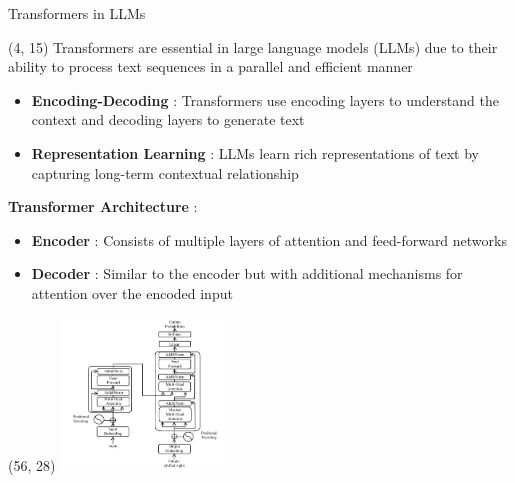 \begin{frame}{Transformers in LLMs}
  \begin{textblock}{55}(4, 15)
    Transformers are essential in large language models (LLMs) due to their ability to process text sequences in a parallel and efficient manner

    \begin{itemize}
        \item \textbf{Encoding-Decoding} : Transformers use encoding layers to understand the context and decoding layers to generate text
        \item \textbf{Representation Learning} : LLMs learn rich representations of text by capturing long-term contextual relationship
    \end{itemize}

    \textbf{Transformer Architecture} : \\
    \begin{itemize}
        \item \textbf{Encoder} : Consists of multiple layers of attention and feed-forward networks
        \item \textbf{Decoder} : Similar to the encoder but with additional mechanisms for attention over the encoded input
    \end{itemize}
  \end{textblock}
  \begin{textblock}{35}(56, 28)
    \includegraphics[width=170px]{img/transformer_architecture.png} %
  \end{textblock}
\end{frame}

